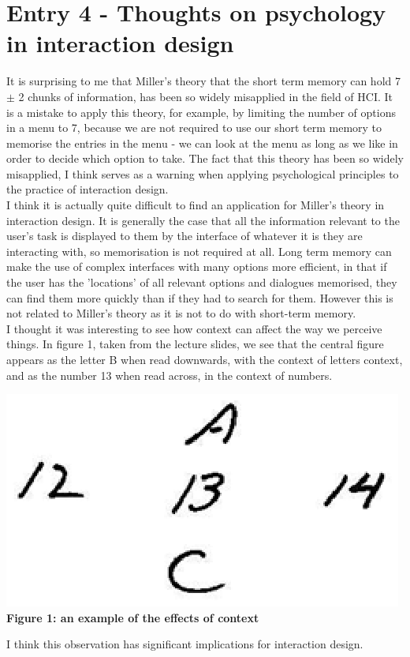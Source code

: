 \documentclass{article}
\begin{document}
\section*{Entry 4 - Thoughts on psychology in interaction design}

\noindent It is surprising to me that Miller's theory that the short term memory can hold 7 $\pm$ 2 chunks of information, has been so widely misapplied in the field of HCI. It is a mistake to apply this theory, for example, by limiting the number of options in a menu to 7, because we are not required to use our short term memory to memorise the entries in the menu - we can look at the menu as long as we like in order to decide which option to take. The fact that this theory has been so widely misapplied, I think serves as a warning when applying psychological principles to the practice of interaction design.
\\\indent I think it is actually quite difficult to find an application for Miller's theory in interaction design. It is generally the case that all the information relevant to the user's task is displayed to them by the interface of whatever it is they are interacting with, so memorisation is not required at all. Long term memory can make the use of complex interfaces with many options more efficient, in that if the user has the 'locations' of all relevant options and dialogues memorised, they can find them more quickly than if they had to search for them. However this is not related to Miller's theory as it is not to do with short-term memory.
\\\indent I thought it was interesting to see how context can affect the way we perceive things. In figure 1, taken from the lecture slides, we see that the central figure appears as the letter B when read downwards, with the context of letters context, and as the number 13 when read across, in the context of numbers.
\\\begin{center}\includegraphics{context}\\\textbf{Figure 1: an example of the effects of context}\end{center}
I think this observation has significant implications for interaction design.
\end{document}
